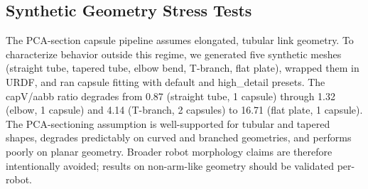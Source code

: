 \subsection{Synthetic Geometry Stress Tests}

The PCA-section capsule pipeline assumes elongated, tubular link geometry. To characterize behavior outside this regime, we generated five synthetic meshes (straight tube, tapered tube, elbow bend, T-branch, flat plate), wrapped them in URDF, and ran capsule fitting with default and high\_detail presets. The capV/aabb ratio degrades from 0.87 (straight tube, 1 capsule) through 1.32 (elbow, 1 capsule) and 4.14 (T-branch, 2 capsules) to 16.71 (flat plate, 1 capsule). The PCA-sectioning assumption is well-supported for tubular and tapered shapes, degrades predictably on curved and branched geometries, and performs poorly on planar geometry. Broader robot morphology claims are therefore intentionally avoided; results on non-arm-like geometry should be validated per-robot.
